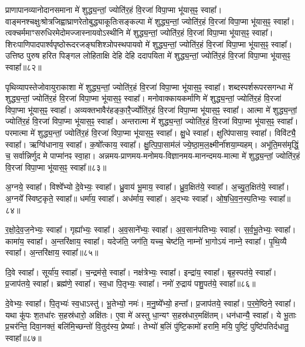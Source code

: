प्राणापानव्यानोदानसमाना मे॑ शुद्ध्य॒न्तां॒ ज्योति॑र॒हं वि॒रजा॑ विपा॒प्मा भू॑यास॒ꣴ॒ स्वाहा᳚।
वाङ्मनश्चक्षुःश्रोत्रजिह्वाघ्राणरेतो\-बुद्ध्याकूतिः\-सङ्कल्पा मे॑ शुद्ध्य॒न्तां॒ ज्योति॑र॒हं वि॒रजा॑ विपा॒प्मा भू॑यास॒ꣴ॒ स्वाहा᳚। 
त्वक्चर्ममाꣳसरुधिरमेदोमज्जास्नायवो\-ऽस्थीनि  मे॑ शुद्ध्य॒न्तां॒ ज्योति॑र॒हं वि॒रजा॑ विपा॒प्मा भू॑यास॒ꣴ॒ स्वाहा᳚। 
शिरःपाणिपादपार्श्वपृष्ठोरूदरजङ्घशिश्ञोपस्थपायवो  मे॑ शुद्ध्य॒न्तां॒ ज्योति॑र॒हं वि॒रजा॑ विपा॒प्मा भू॑यास॒ꣴ॒ स्वाहा᳚।
उत्तिष्ठ पुरुष हरित पिङ्गल लोहिताक्षि देहि देहि ददापयिता मे॑ शुद्ध्य॒न्तां॒ ज्योति॑र॒हं वि॒रजा॑ विपा॒प्मा भू॑यास॒ꣴ॒ स्वाहा᳚॥८२॥ 
\anuvakamend

पृथिव्यापस्तेजोवायुराकाशा मे॑ शुद्ध्य॒न्तां॒ ज्योति॑र॒हं वि॒रजा॑ विपा॒प्मा भू॑यास॒ꣴ॒ स्वाहा᳚। 
शब्दस्पर्शरूपरसगन्धा  मे॑ शुद्ध्य॒न्तां॒ ज्योति॑र॒हं वि॒रजा॑ विपा॒प्मा भू॑यास॒ꣴ॒ स्वाहा᳚। 
मनोवाक्कायकर्माणि  मे॑ शुद्ध्य॒न्तां॒ ज्योति॑र॒हं वि॒रजा॑ विपा॒प्मा भू॑यास॒ꣴ॒ स्वाहा᳚। 
अव्यक्तभावैर॑हङ्का॒रै॒र्ज्योति॑र॒हं वि॒रजा॑ विपा॒प्मा भू॑यास॒ꣴ॒ स्वाहा᳚। 
आत्मा मे॑ शुद्ध्य॒न्तां॒ ज्योति॑र॒हं वि॒रजा॑ विपा॒प्मा भू॑यास॒ꣴ॒ स्वाहा᳚। 
अन्तरात्मा मे॑ शुद्ध्य॒न्तां॒ ज्योति॑र॒हं वि॒रजा॑ विपा॒प्मा भू॑यास॒ꣴ॒ स्वाहा᳚। 
परमात्मा  मे॑ शुद्ध्य॒न्तां॒ ज्योति॑र॒हं वि॒रजा॑ विपा॒प्मा भू॑यास॒ꣴ॒ स्वाहा᳚। 
क्षु॒धे स्वाहा᳚। 
क्षुत्पि॑पासाय॒ स्वाहा᳚। 
विवि॑ट्यै॒ स्वाहा᳚। 
ऋग्वि॑धानाय॒ स्वाहा᳚। 
क॒षो᳚त्काय॒ स्वाहा᳚। 
क्षु॒त्पि॒पा॒साम॑लं ज्ये॒ष्ठा॒म॒ल॒क्ष्मीर्ना॑शया॒म्यहम्। 
अभू॑ति॒मस॑मृद्धिं॒ च॒ सर्वान्निर्णुद मे पाप्मा॑नꣴ स्वा॒हा।
अन्नमय-प्राणमय-मनोमय-विज्ञानमय-मानन्दमय-मात्मा मे॑ शुद्ध्य॒न्तां॒ ज्योति॑र॒हं वि॒रजा॑ विपा॒प्मा भू॑यास॒ꣴ॒ स्वाहा᳚॥८३॥
\anuvakamend

अ॒ग्नये॒ स्वाहा᳚। 
विश्वे᳚भ्यो दे॒वेभ्यः॒ स्वाहा᳚। 
ध्रु॒वाय॑ भू॒माय॒ स्वाहा᳚। 
ध्रु॒व॒क्षित॑ये॒ स्वाहा᳚। 
अ॒च्यु॒त॒क्षित॑ये॒ स्वाहा᳚। 
अ॒ग्नये᳚ स्विष्ट॒कृते॒ स्वाहा᳚॥ 
धर्मा॑य॒ स्वाहा᳚। 
अध॑र्माय॒ स्वाहा᳚। 
अ॒द्भ्यः स्वाहा᳚। 
ओ॒ष॒धि॒व॒न॒स्प॒तिभ्यः॒ स्वाहा᳚॥८४॥ 


र॒क्षो॒दे॒व॒ज॒नेभ्यः॒ स्वाहा᳚। 
गृह्या᳚भ्यः॒ स्वाहा᳚। 
अ॒व॒साने᳚भ्यः॒ स्वाहा᳚। 
अ॒व॒सान॑पतिभ्यः॒ स्वाहा᳚। 
स॒र्व॒भू॒तेभ्यः॒ स्वाहा᳚। 
कामा॑य॒ स्वाहा᳚। 
अ॒न्तरि॑क्षाय॒ स्वाहा᳚। 
यदेज॑ति॒ जग॑ति॒ यच्च॒ चेष्ट॑ति॒ नाम्नो॑ भा॒गोऽयं नाम्ने॒ स्वाहा᳚। 
पृ॒थि॒व्यै स्वाहा᳚। 
अ॒न्तरि॑क्षाय॒ स्वाहा᳚॥८५॥ 


दि॒वे स्वाहा᳚। 
सूर्या॑य॒ स्वाहा᳚। 
च॒न्द्रम॑से॒ स्वाहा᳚। 
नक्ष॑त्रेभ्यः॒ स्वाहा᳚। 
इन्द्रा॑य॒ स्वाहा᳚। 
बृह॒स्पत॑ये॒ स्वाहा᳚। 
प्र॒जाप॑तये॒ स्वाहा᳚। 
ब्रह्म॑णे॒ स्वाहा᳚। 
स्व॒धा पि॒तृभ्यः॒ स्वाहा᳚। 
नमो॑ रु॒द्राय॑ पशु॒पत॑ये॒ स्वाहा᳚॥८६॥

दे॒वेभ्यः॒ स्वाहा᳚। 
पि॒तृभ्यः॑ स्व॒धाऽस्तु॑। 
भू॒तेभ्यो॒ नमः॑। 
म॒नु॒ष्ये᳚भ्यो॒ हन्ता᳚। 
प्र॒जाप॑तये॒ स्वाहा᳚। 
प॒र॒मे॒ष्ठिने॒ स्वाहा᳚। 
यथा कू॑पः श॒तधा॑रः स॒हस्र॑धारो॒ अक्षि॑तः। 
ए॒वा मे॑ अस्तु धा॒न्यꣳ स॒हस्र॑धार॒मक्षि॑तम्। 
धन॑धान्यै॒ स्वाहा᳚। 
ये भू॒ताः प्र॒चर॑न्ति॒ दिवा॒नक्तं॒ बलि॑मि॒च्छन्तो॑ वि॒तुद॑स्य॒ प्रेष्याः᳚। 
तेभ्यो॑ ब॒लिं पु॑ष्टि॒कामो॑ हरामि॒ मयि॒ पुष्टिं॒ पुष्टि॑पतिर्दधातु॒ स्वाहा᳚॥८७॥ 
\anuvakamend

